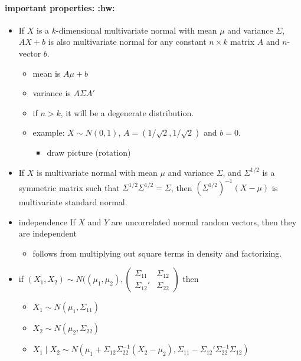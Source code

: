 \paragraph{important properties: \textbf{:hw:}}
\begin{itemize}
\item If $X$ is a $k$-dimensional multivariate normal with mean $\mu$
        and variance $\Sigma$, $A X + b$ is also multivariate normal for
        any constant $n \times k$ matrix $A$ and $n$-vector $b$.
\begin{itemize}
\item mean is $A \mu + b$
\item variance is $A \Sigma A'$
\item if $n > k$, it will be a degenerate distribution.
\item example: $X \sim N(0,1)$, $A = (1/\sqrt{2}, 1/\sqrt{2})$ and
            $b = 0$.
\begin{itemize}
\item draw picture (rotation)
\end{itemize}
\end{itemize}
\item If $X$ is multivariate normal with mean $\mu$ and variance
        $\Sigma$, and $\Sigma^{1/2}$ is a symmetric matrix such that
        $\Sigma^{1/2} \Sigma^{1/2} = \Sigma$, then
        $(\Sigma^{1/2})^{-1} (X - \mu)$ is multivariate standard
        normal.
\item independence
        If $X$ and $Y$ are uncorrelated normal random vectors, then they
        are independent
\begin{itemize}
\item follows from multiplying out square terms in density and
          factorizing.
\end{itemize}
\item if $(X_1,X_2) \sim N((\mu_1,\mu_2), \begin{pmatrix} \Sigma_{11} & \Sigma_{12} \\ \Sigma_{12}' & \Sigma_{22} \end{pmatrix}$ then
\begin{itemize}
\item $X_1 \sim N(\mu_1, \Sigma_{11})$
\item $X_2 \sim N(\mu_2, \Sigma_{22})$
\item $X_1 \mid X_2 \sim N(\mu_1 + \Sigma_{12} \Sigma_{22}^{-1} (X_2 - \mu_2), \Sigma_{11} - \Sigma_{12}'\Sigma_{22}^{-1} \Sigma_{12})$
\begin{itemize}

\end{itemize}
\end{itemize}
\end{itemize}
